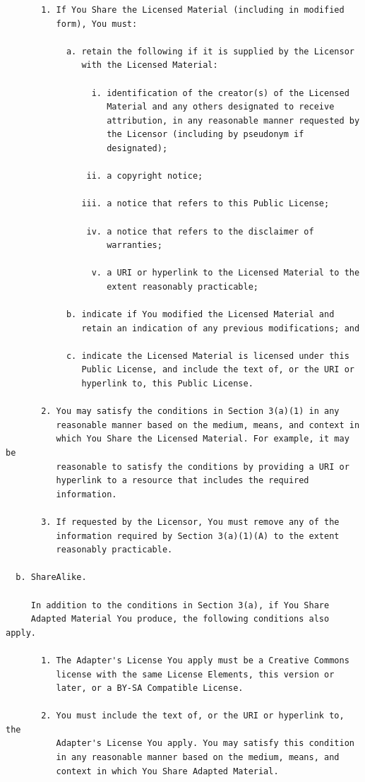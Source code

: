 \documentclass[12pt,spanish,]{article}
\begin{document}
\begin{verbatim}
       1. If You Share the Licensed Material (including in modified
          form), You must:

            a. retain the following if it is supplied by the Licensor
               with the Licensed Material:

                 i. identification of the creator(s) of the Licensed
                    Material and any others designated to receive
                    attribution, in any reasonable manner requested by
                    the Licensor (including by pseudonym if
                    designated);

                ii. a copyright notice;

               iii. a notice that refers to this Public License;

                iv. a notice that refers to the disclaimer of
                    warranties;

                 v. a URI or hyperlink to the Licensed Material to the
                    extent reasonably practicable;

            b. indicate if You modified the Licensed Material and
               retain an indication of any previous modifications; and

            c. indicate the Licensed Material is licensed under this
               Public License, and include the text of, or the URI or
               hyperlink to, this Public License.

       2. You may satisfy the conditions in Section 3(a)(1) in any
          reasonable manner based on the medium, means, and context in
          which You Share the Licensed Material. For example, it may be
          reasonable to satisfy the conditions by providing a URI or
          hyperlink to a resource that includes the required
          information.

       3. If requested by the Licensor, You must remove any of the
          information required by Section 3(a)(1)(A) to the extent
          reasonably practicable.

  b. ShareAlike.

     In addition to the conditions in Section 3(a), if You Share
     Adapted Material You produce, the following conditions also apply.

       1. The Adapter's License You apply must be a Creative Commons
          license with the same License Elements, this version or
          later, or a BY-SA Compatible License.

       2. You must include the text of, or the URI or hyperlink to, the
          Adapter's License You apply. You may satisfy this condition
          in any reasonable manner based on the medium, means, and
          context in which You Share Adapted Material.


\end{verbatim}
\end{document}
